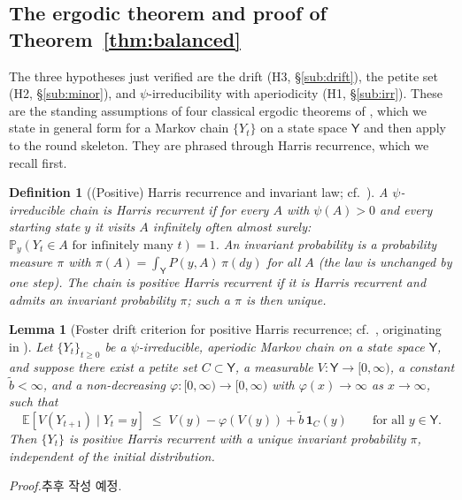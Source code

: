 \documentclass[11pt]{article}
\newtheorem{lem}{Lemma}
\newtheorem{dfn}{Definition}
\theoremstyle{definition}
\begin{document}
\subsection{The ergodic theorem and proof of \texorpdfstring{Theorem~\ref{thm:balanced}}{the balanced theorem}}
\label{sub:thm}

The three hypotheses just verified are the drift (H3, \S\ref{sub:drift}), the petite set (H2, \S\ref{sub:minor}), and $\psi$-irreducibility with aperiodicity (H1, \S\ref{sub:irr}). These are the standing assumptions of four classical ergodic theorems of \cite{MeynTweedie2009}, which we state in general form for a Markov chain $\{Y_t\}$ on a state space $\mathsf{Y}$ and then apply to the round skeleton. They are phrased through Harris recurrence, which we recall first.

\begin{dfn}[(Positive) Harris recurrence and invariant law; cf.\ {\cite[\S9.1, \S10.1]{MeynTweedie2009}}]
\label{dfn:harris}
A $\psi$-irreducible chain is \emph{Harris recurrent} if for every $A$ with $\psi(A) > 0$ and every starting state $y$ it visits $A$ infinitely often almost surely: $\mathbb{P}_y(Y_t \in A \text{ for infinitely many } t) = 1$. An \emph{invariant probability} is a probability measure $\pi$ with $\pi(A) = \int_{\mathsf{Y}} P(y, A)\,\pi(dy)$ for all $A$ (the law is unchanged by one step). The chain is \emph{positive Harris recurrent} if it is Harris recurrent and admits an invariant probability $\pi$; such a $\pi$ is then unique.
\end{dfn}

\begin{lem}[Foster drift criterion for positive Harris recurrence; cf.\ {\cite[Thm.~11.0.1]{MeynTweedie2009}}, originating in {\cite{Foster1953}}]
\label{lem:posHarris}
Let $\{Y_t\}_{t \geq 0}$ be a $\psi$-irreducible, aperiodic Markov chain on a state space $\mathsf{Y}$, and suppose there exist a petite set $C \subset \mathsf{Y}$, a measurable $V \colon \mathsf{Y} \to [0, \infty)$, a constant $\tilde b < \infty$, and a non-decreasing $\varphi \colon [0, \infty) \to [0, \infty)$ with $\varphi(x) \to \infty$ as $x \to \infty$, such that
\[
  \mathbb{E}[V(Y_{t+1}) \mid Y_t = y] \;\leq\; V(y) - \varphi(V(y)) + \tilde b\,\mathbf{1}_C(y) \qquad \text{for all } y \in \mathsf{Y}.
\]
Then $\{Y_t\}$ is positive Harris recurrent with a unique invariant probability $\pi$, independent of the initial distribution.
\end{lem}
\noindent\emph{Proof.}\quad 추후 작성 예정.
\end{document}
